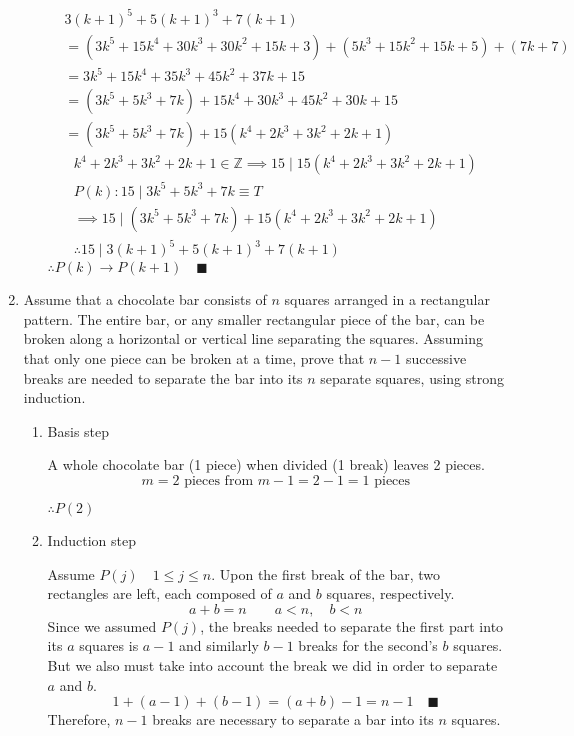 \documentclass[letterpaper, 12pt]{article}
\newcommand{\qed}{\quad \blacksquare}
\newcommand{\then}{\rightarrow}
\newcommand{\Z}{\mathbb{Z}}
\newcommand{\0}{\emptyset}
\begin{document}
\begin{enumerate}
\begin{enumerate}
\begin{align*}
    & 3(k+1)^5 + 5(k+1)^3 + 7(k+1) \\
    &= (3k^5 + 15k^4 +30k^3 +30k^2 + 15k + 3) + (5k^3 + 15k^2 + 15k + 5) + (7k + 7) \\
    &= 3k^5 + 15k^4 + 35k^3 + 45k^2 + 37k + 15 \\
    &= (3k^5 + 5k^3 + 7k) + 15k^4 + 30k^3 + 45k^2 + 30k + 15 \\
    &= (3k^5 + 5k^3 + 7k) + 15(k^4 + 2k^3 + 3k^2 + 2k + 1)
\end{align*}
\begin{gather*}
    k^4 + 2k^3 + 3k^2 + 2k + 1 \in \Z \implies 15 \mid 15(k^4 + 2k^3 + 3k^2 + 2k + 1) \\
    P(k): 15 \mid 3k^5 + 5k^3 + 7k \equiv T \\
    \implies 15 \mid (3k^5 + 5k^3 + 7k) + 15(k^4 + 2k^3 + 3k^2 + 2k + 1) \\
    \therefore 15 \mid 3(k+1)^5 + 5(k+1)^3 + 7(k+1)
\end{gather*}
$\therefore P(k) \then P(k+1) \qed$
\end{enumerate}
\item Assume that a chocolate bar consists of $n$ squares arranged in a rectangular pattern. 
The entire bar, or any smaller rectangular piece of the bar, can be broken along a horizontal 
or vertical line separating the squares. Assuming that only one piece can be broken at a time, 
prove that $n-1$ successive breaks are needed to separate the bar into its $n$ separate squares, 
using strong induction.
\begin{enumerate}
    \item Basis step
    \begin{flushleft}
        A whole chocolate bar (1 piece) when divided (1 break) leaves 2 pieces.
        \[m = 2 \text{ pieces from } m - 1 = 2 - 1 = 1 \text{ pieces}\]
    \end{flushleft}
    $\therefore P(2)$
    \item Induction step
    \begin{flushleft}
        Assume $P(j) \quad 1 \le j \le n$. Upon the first break of the bar, two rectangles are 
        left, each composed of $a$ and $b$ squares, respectively.
        \[a + b = n \qquad a < n, \quad b < n\]
        Since we assumed $P(j)$, the breaks needed to separate the first part into its $a$ squares 
        is $a-1$ and similarly $b-1$ breaks for the second's $b$ squares. But we also must take 
        into account the break we did in order to separate $a$ and $b$.
        \[1 + (a-1) + (b-1) = (a + b) - 1= n - 1 \qed\]
        Therefore, $n - 1$ breaks are necessary to separate a bar into its $n$ squares.
    \end{flushleft}
\end{enumerate}
\end{enumerate}
\end{document}
